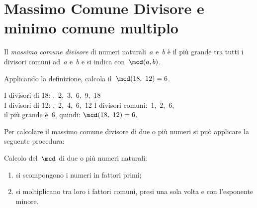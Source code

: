 
\section{Massimo Comune Divisore e minimo comune multiplo}
\label{sec:nat_mcdemcm}

\label{def:mcd}
\begin{definizione}{}{}
Il \emph{massimo comune divisore} di numeri naturali~\(a\) e~\(b\)  è il
più grande tra tutti i divisori comuni ad~\(a\) e~\(b\)
e si indica con~\(\mcd(a,b)\).
\end{definizione}

% 

\begin{esempio}{}{}
Applicando la definizione, calcola il~\(\mcd(18,~12) = 6\).

I divisori di 18: ,~2,~3,~6,~9,~18\\
I divisori di 12: ,~2,~4,~6,~12
I divisori comuni:~1,~2,~6, \\
il più grande è~6, quindi: \quad \(\mcd(18,~12) = 6\). 
\end{esempio}


Per calcolare il massimo comune divisore di due o più numeri si può 
applicare la seguente procedura:

\begin{procedura}{}{}
Calcolo del~\(\mcd\) di due o più numeri naturali:
\begin{enumerate}[noitemsep, label=(\alph*)]
 \item si scompongono i numeri in fattori primi;
 \item si moltiplicano tra loro i fattori comuni, 
  presi una sola volta e con l'esponente minore.
\end{enumerate}
\end{procedura}

